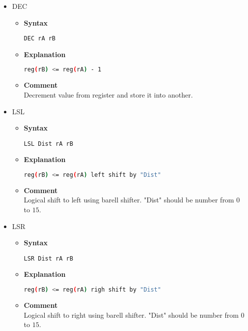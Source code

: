 \begin{itemize}
    \item DEC
    \begin{itemize}
        \item \textbf{Syntax}
        \begin{lstlisting}[language={[x86masm]Assembler}, frame=single]
    DEC rA rB
        \end{lstlisting}
        \item \textbf{Explanation}
        \begin{lstlisting}[language=bash, frame=single]
    reg(rB) <= reg(rA) - 1
        \end{lstlisting}
        \item \textbf{Comment} \\
    Decrement value from register and store it into another.
    \end{itemize}

    \item LSL
    \begin{itemize}
        \item \textbf{Syntax}
        \begin{lstlisting}[language={[x86masm]Assembler}, frame=single]
    LSL Dist rA rB
        \end{lstlisting}
        \item \textbf{Explanation}
        \begin{lstlisting}[language=bash, frame=single]
    reg(rB) <= reg(rA) left shift by "Dist"
        \end{lstlisting}
        \item \textbf{Comment} \\
    Logical shift to left using barell shifter. "Dist" should be number from $0$ to $15$.
    \end{itemize}

    \item LSR
    \begin{itemize}
        \item \textbf{Syntax}
        \begin{lstlisting}[language={[x86masm]Assembler}, frame=single]
    LSR Dist rA rB
        \end{lstlisting}
        \item \textbf{Explanation}
        \begin{lstlisting}[language=bash, frame=single]
    reg(rB) <= reg(rA) righ shift by "Dist"
        \end{lstlisting}
        \item \textbf{Comment} \\
    Logical shift to right using barell shifter. "Dist" should be number from $0$ to $15$.
    \end{itemize}


\end{itemize}
